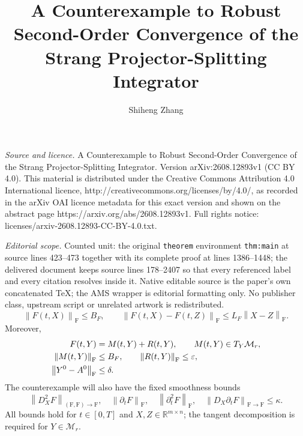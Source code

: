\documentclass[10pt,a4paper]{amsart}
\numberwithin{equation}{section}
\newcommand{\R}{\mathbb{R}}
\newcommand{\Mr}{\mathcal{M}_r}
\newcommand{\F}{\mathrm F}
\newcommand{\norm}[1]{\left\lVert #1\right\rVert}
\newcommand{\eps}{\varepsilon}
\begin{document}
\title[A Counterexample to Robust Second-Order Convergence of the S]{A Counterexample to Robust Second-Order Convergence of the Strang Projector-Splitting Integrator}
\author{Shiheng Zhang}
\date{}
\maketitle
\noindent\emph{Source and licence.} A Counterexample to Robust Second-Order Convergence of the Strang Projector-Splitting Integrator. Version arXiv:2608.12893v1 (CC BY 4.0). This material is distributed under the Creative Commons Attribution 4.0 International licence, http://creativecommons.org/licenses/by/4.0/, as recorded in the arXiv OAI licence metadata for this exact version and shown on the abstract page https://arxiv.org/abs/2608.12893v1. Full rights notice: licenses/arxiv-2608.12893-CC-BY-4.0.txt.\par\smallskip
\noindent\textit{Editorial scope.} Counted unit: the original \texttt{theorem} environment \texttt{thm:main} at source lines 423--473 together with its complete proof at lines 1386--1448; the delivered document keeps source lines 178--2407 so that every referenced label and every citation resolves inside it. Native editable source is the paper's own concatenated TeX; the AMS wrapper is editorial formatting only. No publisher class, upstream script or unrelated artwork is redistributed.
\begin{equation}\label{eq:basic-bounds}
 \norm{F(t,X)}_{\F}\le B_F,\qquad
 \norm{F(t,X)-F(t,Z)}_{\F}\le L_F\norm{X-Z}_{\F}.
\end{equation}
Moreover,
\begin{align}
 F(t,Y)&=M(t,Y)+R(t,Y),\qquad M(t,Y)\in T_Y\Mr,\notag\\
 \norm{M(t,Y)}_{\F}&\le B_F,\qquad \norm{R(t,Y)}_{\F}\le\eps,
 \label{eq:tangent-decomp}\\
 \norm{Y^0-A^0}_{\F}&\le\delta.
 \label{eq:remainder-initial}
\end{align}
The counterexample will also have the fixed smoothness bounds
\begin{equation}\label{eq:smooth-bounds}
 \norm{D_X^2F}_{(\F,\F)\to\F},\quad
 \norm{\partial_tF}_{\F},\quad
 \norm{\partial_t^2F}_{\F},\quad
 \norm{D_X\partial_tF}_{\F\to\F}
 \le\kappa.
\end{equation}
All bounds hold for $t\in[0,T]$ and $X,Z\in\R^{m\times n}$; the tangent
decomposition is required for $Y\in\Mr$.
\end{document}
